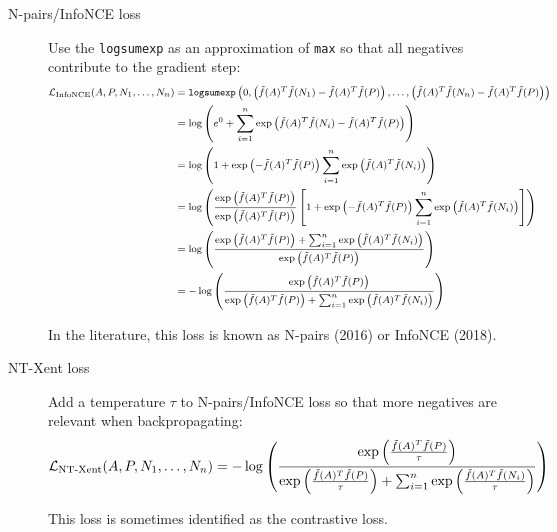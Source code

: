\begin{description}
    \item[N-pairs/InfoNCE loss] 
        Use the \texttt{logsumexp} as an approximation of \texttt{max} so that all negatives contribute to the gradient step:
        \[
            \footnotesize
            \begin{split}
                \mathcal{L}_\text{InfoNCE}(A, P, N_1, \dots, N_n) &= \texttt{logsumexp}\left( 0, 
                \left(\tilde{f}(A)^T \tilde{f}(N_1) - \tilde{f}(A)^T \tilde{f}(P)\right),
                \dots, \left(\tilde{f}(A)^T \tilde{f}(N_n) - \tilde{f}(A)^T \tilde{f}(P)\right) \right) \\
                &= \log\left( e^0 + \sum_{i=1}^{n} \exp\left(\tilde{f}(A)^T\tilde{f}(N_i) - \tilde{f}(A)^T\tilde{f}(P)\right) \right) \\
                &= \log\left( 1 + \exp\left(-\tilde{f}(A)^T\tilde{f}(P)\right) \sum_{i=1}^{n} \exp\left(\tilde{f}(A)^T\tilde{f}(N_i)\right) \right) \\
                &= \log\left(
                    \frac{\exp\left( \tilde{f}(A)^T\tilde{f}(P) \right)}{\exp\left( \tilde{f}(A)^T\tilde{f}(P) \right)}
                    \left[1 + \exp\left(-\tilde{f}(A)^T\tilde{f}(P)\right) \sum_{i=1}^{n} \exp\left(\tilde{f}(A)^T\tilde{f}(N_i)\right) \right] 
                    \right) \\
                &= \log\left( \frac{\exp\left( \tilde{f}(A)^T\tilde{f}(P) \right) + \sum_{i=1}^{n} \exp\left(\tilde{f}(A)^T\tilde{f}(N_i)\right)}{\exp\left( \tilde{f}(A)^T\tilde{f}(P) \right)} \right) \\
                &= -\log\left( \frac{\exp\left( \tilde{f}(A)^T\tilde{f}(P) \right)}{\exp\left( \tilde{f}(A)^T\tilde{f}(P) \right) + \sum_{i=1}^{n} \exp\left(\tilde{f}(A)^T\tilde{f}(N_i)\right)} \right) \\
            \end{split}
        \]

        \begin{remark}
            In the literature, this loss is known as N-pairs (2016) or InfoNCE (2018).
        \end{remark}

    \item[NT-Xent loss] 
        Add a temperature $\tau$ to N-pairs/InfoNCE loss so that more negatives are relevant when backpropagating:
        \[ 
            \small
            \mathcal{L}_\text{NT-Xent}(A, P, N_1, \dots, N_n) =
            -\log\left( \frac{\exp\left( \frac{\tilde{f}(A)^T\tilde{f}(P)}{\tau} \right)}{\exp\left( \frac{\tilde{f}(A)^T\tilde{f}(P)}{\tau} \right) + \sum_{i=1}^{n} \exp\left(\frac{\tilde{f}(A)^T\tilde{f}(N_i)}{\tau}\right)} \right)
        \]

        \begin{remark}
            This loss is sometimes identified as the contrastive loss.
        \end{remark}
\end{description}

